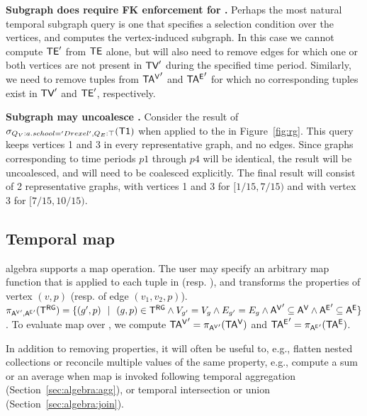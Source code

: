 {\bf Subgraph does require FK enforcement for \tve.}  Perhaps the most
natural temporal subgraph query is one that specifies a selection
condition over the vertices, and computes the vertex-induced subgraph.
In this case we cannot compute $\textsf{TE}'$ from $\textsf{TE}$ alone, but will also
need to remove edges for which one or both vertices are not present in
$\textsf{TV}'$ during the specified time period.  Similarly, we need to remove
tuples from $\mathsf{TA^{V}}'$ and $\mathsf{TA^{E}}'$ for which no corresponding tuples
exist in $\textsf{TV}'$ and $\textsf{TE}'$, respectively.

{\bf Subgraph may uncoalesce \trg.} Consider the result of
$\sigma_{Q_V:{a.school='Drexel'},Q_E:\top} (\textsf{T1})$ when applied
to the \tg in Figure~\ref{fig:rg}.  This query keeps vertices 1 and 3
in every representative graph, and no edges.  Since graphs
corresponding to time periods $p1$ through $p4$ will be identical, the
result will be uncoalesced, and will need to be coalesced explicitly.
The final result will consist of 2 representative graphs, with
vertices 1 and 3 for $[1/15, 7/15)$ and with vertex 3 for $[7/15,
    10/15)$.

\subsection{Temporal map}%
\label{sec:algebra:project}


\tg algebra supports a map operation.  The user may specify an
arbitrary map function that is applied to each tuple in \avv
(resp. \aee), and transforms the properties of vertex $(v,p)$
(resp. of edge $(v_1,v_2,p)$).  $\pi_{\mathsf{A^{V}}',\mathsf{A^{E}}'} (\mathsf{T^{RG}}) = \{ (g',
p)~~|~~(g, p) \in \mathsf{T^{RG}} \wedge V_{g'} = V_{g} \wedge E_{g'} = E_{g}
\wedge \mathsf{A^{V}}' \subseteq \mathsf{A^{V}} \wedge \mathsf{A^{E}}' \subseteq \mathsf{A^{E}} \}$.  To
evaluate map over \tve, we compute $\mathsf{TA^{V}}' = \pi_{\mathsf{A^{V}}'} (\mathsf{TA^{V}})$ and
$\mathsf{TA^{E}}' = \pi_{\mathsf{A^{E}}'} (\mathsf{TA^{E}})$.


In addition to removing properties, it will often be useful to, e.g.,
flatten nested collections or reconcile multiple values of the same
property, e.g., compute a sum or an average when map is invoked
following temporal aggregation (Section~\ref{sec:algebra:agg}), or
temporal intersection or union (Section~\ref{sec:algebra:join}).

